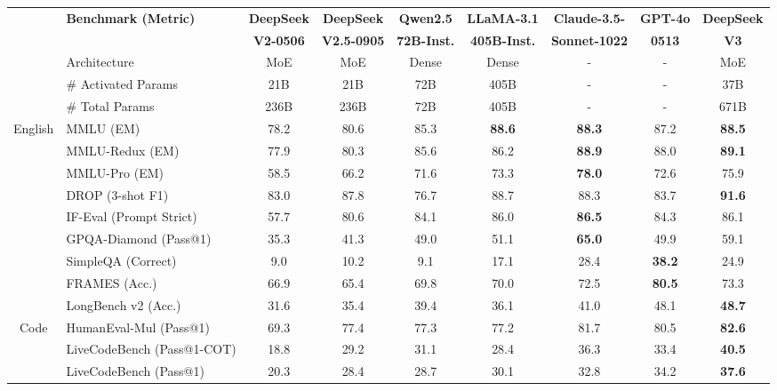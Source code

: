 \documentclass[11pt, a4paper, logo, copyright, nonumbering]{deepseek}
\begin{document}
\begin{CJK*}{UTF8}{gbsn}
\begin{table}[h]
    \centering
    \footnotesize
    \setlength{\tabcolsep}{1.9pt}
    \begin{tabular}{@{}c l | c  c | c c c c| c@{}}
    \toprule
    & \multirow{2}{*}{\centering \textbf{Benchmark {\tiny (Metric)}}} & {\textbf{DeepSeek}} & {\textbf{DeepSeek}} & \textbf{Qwen2.5} & \textbf{LLaMA-3.1}  & \textbf{Claude-3.5-}  & \textbf{GPT-4o}& \textbf{DeepSeek} \\
    & & \textbf{V2-0506}& \textbf{V2.5-0905} & \textbf{72B-Inst.} & \textbf{405B-Inst.} & \textbf{Sonnet-1022}  & \textbf{0513} & \textbf{V3} \\
    \midrule
    & Architecture &  MoE & MoE & Dense & Dense &-&- & MoE \\
    & \# Activated Params & 21B & 21B & 72B & 405B& -&-& 37B \\
    & \# Total Params &  236B & 236B & 72B & 405B &-&-& 671B \\
    \midrule
    \multirow{8}{*}{English}&   MMLU {\tiny (EM)}  & 78.2 & 80.6 & 85.3& \textbf{88.6} & \textbf{88.3}&87.2 & \textbf{88.5} \\
     & MMLU-Redux {\tiny (EM)} &77.9 & 80.3 &  85.6 &86.2& \textbf{88.9}& 88.0 & \textbf{89.1}\\
    & MMLU-Pro {\tiny (EM)} & 58.5 &  66.2 & 71.6 &73.3 & \textbf{78.0} & 72.6 & 75.9\\
    & DROP {\tiny (3-shot F1)} &83.0 & 87.8 & 76.7 & 88.7 & 88.3 & 83.7 & \textbf{91.6}\\
    & IF-Eval {\tiny (Prompt Strict)} &57.7 & 80.6 & 84.1 & 86.0 & \textbf{86.5} & 84.3 & 86.1\\
    & GPQA-Diamond {\tiny (Pass@1)} & 35.3 & 41.3& 49.0 & 51.1& \textbf{65.0} & 49.9 & 59.1\\
    & SimpleQA {\tiny (Correct)} & 9.0 & 10.2 & 9.1 & 17.1& 28.4 & \textbf{38.2}& 24.9\\
     & FRAMES {\tiny (Acc.)} & 66.9 & 65.4 & 69.8 & 70.0 & 72.5 & \textbf{80.5} & 73.3 \\
     & LongBench v2 {\tiny (Acc.)} & 31.6 & 35.4 & 39.4 & 36.1 & 41.0 & 48.1 &\textbf{48.7} \\
    \midrule
    \multirow{5}{*}{Code} & HumanEval-Mul {\tiny (Pass@1)} & 69.3 &77.4 & 77.3 & 77.2 & {81.7} &80.5&\textbf{82.6}\\
    & LiveCodeBench {\tiny (Pass@1-COT)} &18.8 & 29.2 & 31.1 & 28.4 & 36.3& 33.4& \textbf{40.5} \\
    & LiveCodeBench {\tiny (Pass@1)} &20.3 & 28.4 & 28.7 & 30.1 & 32.8& 34.2& \textbf{37.6} \\

\end{tabular}
\end{table}
\end{CJK*}
\end{document}
